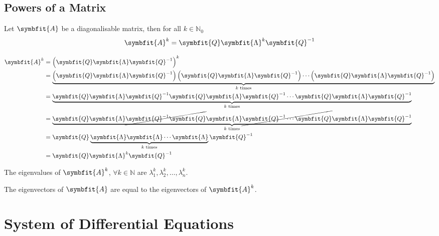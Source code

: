 \documentclass{article}
\begin{document}
	\subsection{Powers of a Matrix}
	\begin{theorem}
		Let $\symbfit{A}$ be a diagonalisable matrix, then for all $k \in \mathbb{N}_0$
		\begin{equation*}
			\symbfit{A}^k = \symbfit{Q} \symbfit{\Lambda}^k \symbfit{Q}^{-1}
		\end{equation*}
	\end{theorem}
	\begin{solutionF}[Proof]
		\begin{align*}
			\symbfit{A}^k &= \left( \symbfit{Q} \symbfit{\Lambda} \symbfit{Q}^{-1} \right)^k \\
			&= \underbrace{\left( \symbfit{Q} \symbfit{\Lambda} \symbfit{Q}^{-1} \right)\left( \symbfit{Q} \symbfit{\Lambda} \symbfit{Q}^{-1} \right)\cdots\left( \symbfit{Q} \symbfit{\Lambda} \symbfit{Q}^{-1} \right)}_{\text{$k$ times}} \\
			&= \underbrace{\symbfit{Q} \symbfit{\Lambda} \symbfit{Q}^{-1} \symbfit{Q} \symbfit{\Lambda} \symbfit{Q}^{-1} \cdots \symbfit{Q} \symbfit{\Lambda} \symbfit{Q}^{-1} }_{\text{$k$ times}} \\
			&= \underbrace{\symbfit{Q} \symbfit{\Lambda} \cancel{\symbfit{Q}^{-1} \symbfit{Q}} \symbfit{\Lambda} \cancel{\symbfit{Q}^{-1} \cdots \symbfit{Q}} \symbfit{\Lambda} \symbfit{Q}^{-1} }_{\text{$k$ times}} \\
			&= \symbfit{Q} \underbrace{ \symbfit{\Lambda} \symbfit{\Lambda} \cdots \symbfit{\Lambda} }_{\text{$k$ times}}\symbfit{Q}^{-1} \\
			&= \symbfit{Q} \symbfit{\Lambda}^k\symbfit{Q}^{-1}
		\end{align*}
	\end{solutionF}
	\begin{theorem}
		The eigenvalues of $\symbfit{A}^k$, $\forall k \in \mathbb{N}$ are $\lambda_1^k, \lambda_2^k, \dots, \lambda_n^k$.
	\end{theorem}
	\begin{theorem}
		The eigenvectors of $\symbfit{A}$ are equal to the eigenvectors of $\symbfit{A}^k$.
	\end{theorem}
	\newpage
\section{System of Differential Equations}
\end{document}
